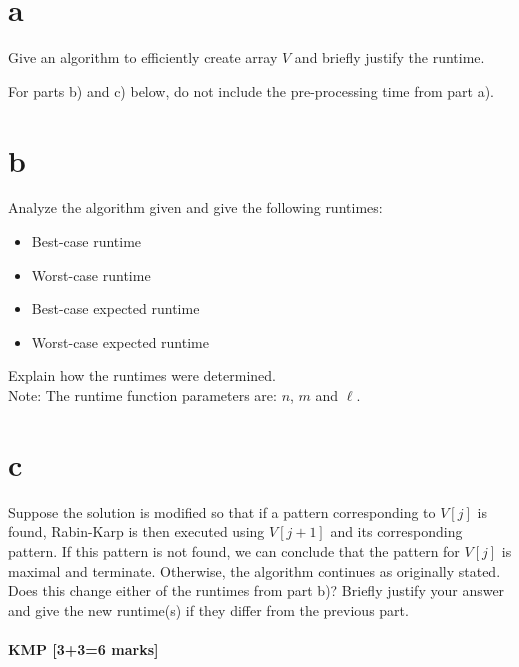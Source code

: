 \documentclass[12pt]{article}
\begin{document}
	\begin{enumerate}
		\part{a} Give an algorithm to efficiently create array $V$ and briefly justify the runtime.
		
		For parts b) and c) below, do not include the pre-processing time from part a).
		
		\part{b} Analyze the algorithm given and give the following runtimes:
		\begin{itemize}
			\item Best-case runtime
			\item Worst-case runtime
			\item Best-case expected runtime
			\item Worst-case expected runtime
		\end{itemize}
		Explain how the runtimes were determined. \\
		Note: The runtime function parameters are: $n$, $m$ and $\ell$.
		
		\part{c} Suppose the solution is modified so that if a pattern corresponding to $V[j]$ is found, Rabin-Karp is then executed using $V[j+1]$ and its corresponding pattern.  
		If this pattern is not found, we can conclude that the pattern for $V[j]$ is maximal and terminate.  
		Otherwise, the algorithm continues as originally stated. \\
		Does this change either of the runtimes from part b)?  Briefly justify your answer and give the new runtime(s) if they differ from the previous part. \\
		
	\end{enumerate}
	
	\subsection{KMP [3+3=6 marks]} 
	
\end{document}
